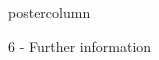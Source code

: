 \documentclass{beamer}
\begin{document}
\begin{frame}
\begin{columns}
\begin{column}{.249\textwidth}
\begin{beamercolorbox}[center]{postercolumn}
\begin{minipage}{.98\textwidth}
{\begin{myblock}{6 - Further information}



\end{myblock}\vfill		
				
	}\end{minipage}\end{beamercolorbox}
		\end{column}
		
\end{columns}
\end{frame}
\end{document}
